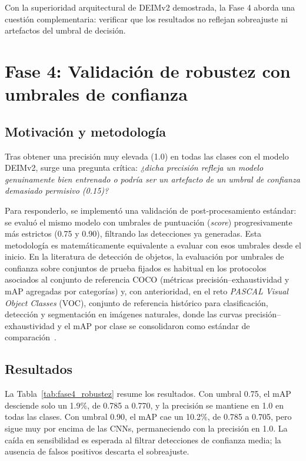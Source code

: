 Con la superioridad arquitectural de DEIMv2 demostrada, la Fase 4 aborda una cuestión complementaria: verificar que los resultados no reflejan sobreajuste ni artefactos del umbral de decisión.

\FloatBarrier
\section{Fase 4: Validación de robustez con umbrales de confianza}
\label{sec:fase4}

\subsection{Motivación y metodología}

Tras obtener una precisión muy elevada (1.0) en todas las clases con el modelo DEIMv2, surge una pregunta crítica: \textit{¿dicha precisión refleja un modelo genuinamente bien entrenado o podría ser un artefacto de un umbral de confianza demasiado permisivo (0.15)?}

Para responderlo, se implementó una validación de post-procesamiento estándar: se evaluó el mismo modelo con umbrales de puntuación (\textit{score}) progresivamente más estrictos (0.75 y 0.90), filtrando las detecciones ya generadas. Esta metodología es matemáticamente equivalente a evaluar con esos umbrales desde el inicio. En la literatura de detección de objetos, la evaluación por umbrales de confianza sobre conjuntos de prueba fijados es habitual en los protocolos asociados al conjunto de referencia COCO (métricas precisión--exhaustividad y mAP agregadas por categorías) y, con anterioridad, en el reto \textit{PASCAL Visual Object Classes} (VOC), conjunto de referencia histórico para clasificación, detección y segmentación en imágenes naturales, donde las curvas precisión--exhaustividad y el mAP por clase se consolidaron como estándar de comparación~\cite{everingham2010pascal}.

\subsection{Resultados}

La Tabla~\ref{tab:fase4_robustez} resume los resultados. Con umbral 0.75, el mAP desciende solo un 1.9\%, de 0.785 a 0.770, y la precisión se mantiene en 1.0 en todas las clases. Con umbral 0.90, el mAP cae un 10.2\%, de 0.785 a 0.705, pero sigue muy por encima de las CNNs, permaneciendo con la precisión en 1.0. La caída en sensibilidad es esperada al filtrar detecciones de confianza media; la ausencia de falsos positivos descarta el sobreajuste.

